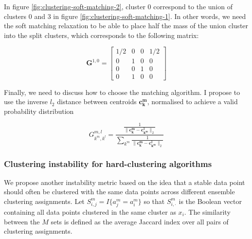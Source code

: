 In figure \ref{fig:clustering-soft-matching-2}, cluster $0$ correspond to the union of clusters $0$ and $3$ in figure \ref{fig:clustering-soft-matching-1}. In other words, we need the soft matching relaxation to be able to place half the mass of the union cluster into the split clusters, which corresponds to the following matrix:

\begin{equation}
   \boldsymbol{G}^{1,0} = 
   \begin{bmatrix}
    1/2 & 0 & 0 & 1/2 \\
    0 & 1 & 0 & 0\\
    0 & 0 & 1 & 0 \\
    0 & 1 & 0 & 0
    \end{bmatrix}
\end{equation}

Finally, we need to discuss how to choose the matching algorithm. I propose to use the inverse $l_2$ distance between centroids $\boldsymbol{c_k^m}$, normalised to achieve a valid probability distribution

\begin{equation}
    G^{m,l}_{k^m, k^l} = \frac{\frac{1}{\lVert \boldsymbol{c_k^m - c_{k^m}^l} \lVert_2}}{\sum_{k^m} \frac{1}{\lVert \boldsymbol{c_k^m - c_{k^m}^l} \lVert_2}}
\end{equation}

\subsubsection{Clustering instability for hard-clustering algorithms}

We propose another instability metric based on the idea that a stable data point should often be clustered with the same data points across different ensemble clustering assignments. Let $S_{i,j}^m = I\{a_j^m = a_i^m\}$ so that $S_{i, \cdot}^m$ is the Boolean vector containing all data points clustered in the same cluster as $x_i$. The similarity between the $M$ sets is defined as the average Jaccard index over all pairs of clustering assignments.
